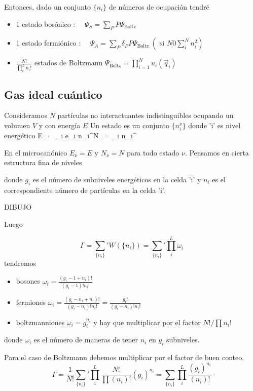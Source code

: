 \documentclass[10pt,oneside]{CBFT_book}
\begin{document}
Entonces, dado un conjunto $ \{ n_i \} $ de números de ocupación tendré 

\begin{itemize}
\item 1 estado bosónico : $ \quad \Psi_S = \sum_P P \Psi_{\text{Boltz}}$
\item 1 estado fermiónico : $ \quad \Psi_A = \sum_P \delta_P P \Psi_{\text{Boltz}} 
	\; (\text{ si } N 0 \sum_i^N n_i^2 )$
\item $ \frac{N!}{\prod_i^L n_i!} $ estados de Boltzmann $ \Psi_{\text{Boltz}} = \prod_{i=1}^N u_i(\vec{q}_i) $
\end{itemize}


\subsection{Gas ideal cuántico}

Consideramos $N$ partículas no interactuantes indistinguibles ocupando un volumen $V$ y con energía $E$
Un estado es un conjunto $ \{ n_i^\nu \} $ donde 'i' es nivel energético
\be
	E_\nu = \sum_i e_i n_i^\nu \qquad \qquad N_\nu = \sum_i n_i^\nu
	\label{cond_EN}
\ee

En el microcanónico $ E_\nu = E $ y $ N_\nu = N $ para todo estado $\nu$. Pensamos en cierta estructura 
fina de niveles


donde $g_i$ es el número de subniveles energéticos en la celda 'i' y $n_i$ es el correspondiente número de
partículas en la celda 'i'.

DIBUJO

Luego

\[
	\Gamma = \sum_{ \{ n_i \} }' W(\{ n_i \}) = \sum_{ \{ n_i \} }' \prod_i^L  \omega_i 
\]
tendremos
\begin{itemize}
 \item bosones $ \omega_i = \frac{ ( g_i - 1 + n_i)! }{ (g_i - 1)!n_i!} $
 \item fermiones $ \omega_i = \frac{ ( g_i - n_i + n_i )! }{ (g_i - n_i)!n_i!} =
		\frac{ g_i! }{ (g_i -n_i )! n_i!}$
 \item boltzmanniones $ \omega_i = g_i^{n_i} $ y hay que multiplicar por el factor
		$ N! / \prod n_i! $
\end{itemize}
donde $ \omega_i $ es el número de maneras de tener $ n_i $ en $ g_i $ subniveles.

Para el caso de Boltzmann debemos multiplicar por el factor de buen conteo,
\[
	\Gamma = \frac{1}{N!} \sum_{ \{ n_i \} }' \prod_i^L \frac{N!}{\prod (n_i)!}(g_i)^{n_i}
	= \sum_{ \{ n_i \} } \prod_i^L \frac{ (g_i)^{n_i} }{ (n_i)! }
\]
\end{document}
